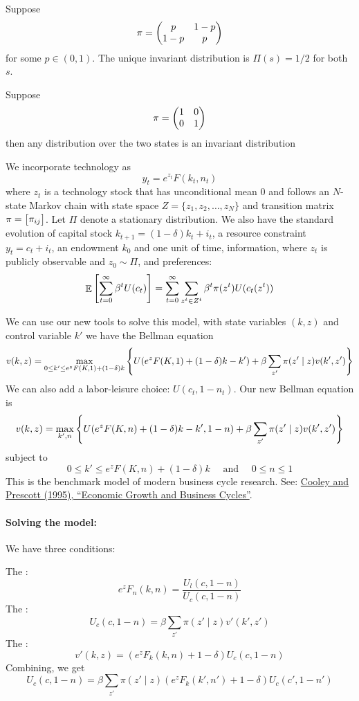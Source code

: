 \documentclass[10pt]{article}
\begin{document}
	\begin{example}
	Suppose 
	\[
	\pi = \begin{pmatrix}p & 1-p \\ 1-p & p\end{pmatrix}
	\]
	for some $p \in (0,1)$. The unique invariant distribution is $\Pi(s) = 1/2$ for both $s$. 
	
	Suppose
	\[
	\pi = \begin{pmatrix}1 & 0 \\ 0 & 1\end{pmatrix}
	\]
	then any distribution over the two states is an invariant distribution
	\end{example}

\begin{model}
	 We incorporate technology as
	\[
	y_t = e^{z_t} F(k_t,n_t)
	\]
	where $z_t$ is a technology stock that has unconditional mean 0 and follows an $N$-state Markov chain with state space $Z = \{z_1,z_2,\dots,z_N\}$ and transition matrix $\pi = \begin{bmatrix}\pi_{ij}\end{bmatrix}$. Let $\Pi$ denote a stationary distribution. We also have the standard evolution of capital stock $k_{t+1} = (1-\delta) k_t + i_t$, a resource constraint $y_t = c_t + i_t$, an endowment $k_0$ and one unit of time, information, where $z_t$ is publicly observable and $z_0 \sim \Pi$, and preferences:
	\[
	\mathop{\mathbb{E}}\left[ \sum_{t=0}^\infty \beta^t U(c_t)\right] = \sum_{t=0}^\infty \sum_{z^t \in Z^t} \beta^t \pi(z^t) U(c_t(z^t))
	\]
	
	We can use our new tools to solve this model, with state variables $(k,z)$ and control variable $k'$ we have the Bellman equation
	\[
	v(k,z) = \max_{0 \le k' \le e^z F(K,1) + (1-\delta)k} \left\{ U(e^z F(K,1) + (1-\delta)k - k') + \beta \sum_{z'} \pi(z' \mid z) v(k',z') \right\}
	\]
	We can also add a labor-leisure choice: $U(c_t, 1 - n_t)$. Our new Bellman equation is
	\[
	v(k,z) = \max_{k',n} \left\{ U(e^z F(K,n) + (1-\delta)k - k', 1-n) + \beta \sum_{z'} \pi(z' \mid z) v(k',z') \right\}
	\]
	subject to
	\[
	0 \le k' \le e^z F(K,n) + (1-\delta)k \quad \text{ and } \quad 0 \le n \le 1
	\]
	This is the benchmark model of modern business cycle research. See: \href{https://www.minneapolisfed.org/~/media/files/research/prescott/papers/econgrowth.pdf?la=en}{Cooley and Prescott (1995), ``Economic Growth and Business Cycles''}.
\end{model}

\paragraph{Solving the model:} We have three conditions: 

The :
\[
e^z F_n(k,n) = \frac{U_l(c,1-n)}{U_c(c,1-n)}
\]
The :
\[
U_c(c,1-n) = \beta\sum_{z'} \pi(z' \mid z) v'(k',z')
\]
The :
\[
v'(k,z) = (e^zF_k(k,n) + 1 - \delta) U_c(c,1-n)
\]
Combining, we get
\[
U_c(c,1-n) = \beta \sum_{z'} \pi(z' \mid z) (e^zF_k(k',n') + 1 - \delta) U_c(c',1-n')
\]
\end{document}
